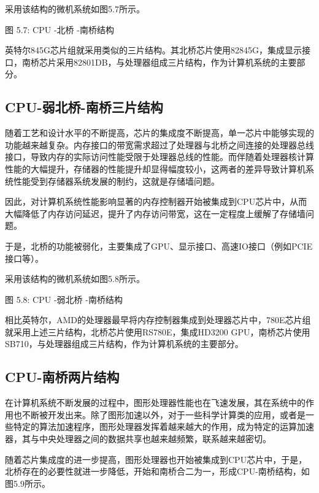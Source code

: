 \documentclass[]{ctexbook}
\begin{document}
采用该结构的微机系统如图5.7所示。

图 5.7: CPU -北桥 -南桥结构

英特尔845G芯片组就采用类似的三片结构。其北桥芯片使用82845G，集成显示接口，南桥芯片采用82801DB，与处理器组成三片结构，作为计算机系统的主要部分。

\hypertarget{cpu-ux5f31ux5317ux6865-ux5357ux6865ux4e09ux7247ux7ed3ux6784}{%
\subsection{CPU-弱北桥-南桥三片结构}\label{cpu-ux5f31ux5317ux6865-ux5357ux6865ux4e09ux7247ux7ed3ux6784}}

随着工艺和设计水平的不断提高，芯片的集成度不断提高，单一芯片中能够实现的功能越来越复杂。内存接口的带宽需求超过了处理器与北桥之间连接的处理器总线接口，导致内存的实际访问性能受限于处理器总线的性能。而伴随着处理器核计算性能的大幅提升，存储器的性能提升却显得幅度较小，这两者的差异导致计算机系统性能受到存储器系统发展的制约，这就是存储墙问题。

因此，对计算机系统性能影响显著的内存控制器开始被集成到CPU芯片中，从而大幅降低了内存访问延迟，提升了内存访问带宽，这在一定程度上缓解了存储墙问题。

于是，北桥的功能被弱化，主要集成了GPU、显示接口、高速IO接口（例如PCIE接口等）。

采用该结构的微机系统如图5.8所示。

图 5.8: CPU -弱北桥 -南桥结构

相比英特尔，AMD的处理器最早将内存控制器集成到处理器芯片中，780E芯片组就采用上述三片结构，北桥芯片使用RS780E，集成HD3200 GPU，南桥芯片使用SB710，与处理器组成三片结构，作为计算机系统的主要部分。

\hypertarget{cpu-ux5357ux6865ux4e24ux7247ux7ed3ux6784}{%
\subsection{CPU-南桥两片结构}\label{cpu-ux5357ux6865ux4e24ux7247ux7ed3ux6784}}

在计算机系统不断发展的过程中，图形处理器性能也在飞速发展，其在系统中的作用也不断被开发出来。除了图形加速以外，对于一些科学计算类的应用，或者是一些特定的算法加速程序，图形处理器发挥着越来越大的作用，成为特定的运算加速器，其与中央处理器之间的数据共享也越来越频繁，联系越来越密切。

随着芯片集成度的进一步提高，图形处理器也开始被集成到CPU芯片中，于是，北桥存在的必要性就进一步降低，开始和南桥合二为一，形成CPU-南桥结构，如图5.9所示。
\end{document}
